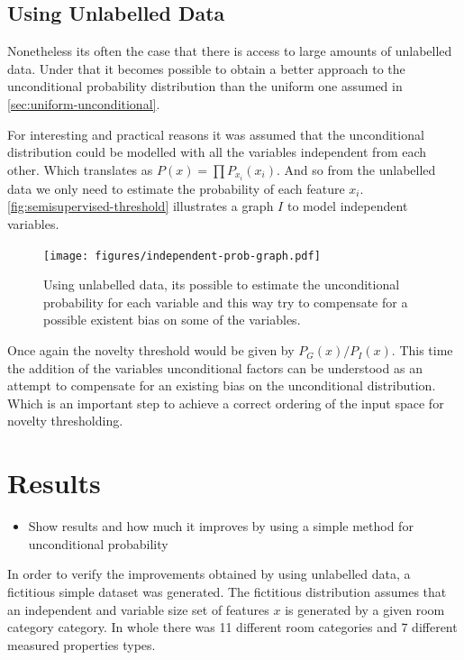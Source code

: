 \documentclass[runningheads,a4paper]{llncs}
\begin{document}
\subsection{Using Unlabelled Data}
Nonetheless its often the case that there is access to large amounts of unlabelled data.
Under that it becomes possible to obtain a better approach to the unconditional probability
distribution than the uniform one assumed in \autoref{sec:uniform-unconditional}.

For interesting and practical reasons it was assumed that the unconditional distribution
could be modelled with all the variables independent from each other.
Which translates as $P(x)=\prod{P_{x_i}(x_i)}$.
And so from the unlabelled data we only need to estimate the probability of each feature $x_i$.
\autoref{fig:semisupervised-threshold} illustrates a graph $I$ to model independent variables.

\begin{figure}[h]
\centering
\texttt{[image: figures/independent-prob-graph.pdf]}
\caption{\label{fig:semisupervised-threshold}Using unlabelled data, its possible to estimate
         the unconditional probability for each variable and this way try to compensate
         for a possible existent bias on some of the variables.}
\end{figure}

Once again the novelty threshold would be given by $P_G(x)/P_I(x)$.
This time the addition of the variables unconditional factors can be understood as an
attempt to compensate for an existing bias on the unconditional distribution.
Which is an important step to achieve a correct ordering of the input space for novelty
thresholding.


\section{Results}
\begin{itemize}
\item Show results and how much it improves by using a simple method for unconditional probability
\end{itemize}

In order to verify the improvements obtained by using unlabelled data, a fictitious simple dataset was generated.
The fictitious distribution assumes that an independent and variable size set of features $x$ is generated by a
given room category category. In whole there was 11 different room categories and 7 different measured properties types.
\end{document}

